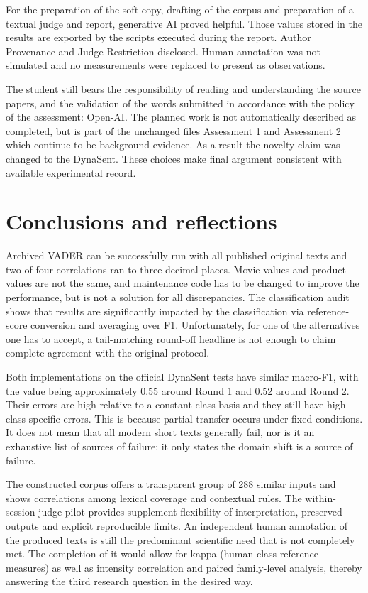 \documentclass[11pt]{article}
\begin{document}
For the preparation of the soft copy, drafting of the corpus and preparation of a textual judge and report, generative AI proved helpful. Those values stored in the results are exported by the scripts executed during the report. Author Provenance and Judge Restriction disclosed. Human annotation was not simulated and no measurements were replaced to present as observations.


The student still bears the responsibility of reading and understanding the source papers, and the validation of the words submitted in accordance with the policy of the assessment: Open-AI. The planned work is not automatically described as completed, but is part of the unchanged files Assessment 1 and Assessment 2 which continue to be background evidence. As a result the novelty claim was changed to the DynaSent. These choices make final argument consistent with available experimental record.


\section{Conclusions and reflections}

Archived VADER can be successfully run with all published original texts and two of four correlations ran to three decimal places. Movie values and product values are not the same, and maintenance code has to be changed to improve the performance, but is not a solution for all discrepancies. The classification audit shows that results are significantly impacted by the classification via reference-score conversion and averaging over F1. Unfortunately, for one of the alternatives one has to accept, a tail-matching round-off headline is not enough to claim complete agreement with the original protocol.


Both implementations on the official DynaSent tests have similar macro-F1, with the value being approximately 0.55 around Round 1 and 0.52 around Round 2. Their errors are high relative to a constant class basis and they still have high class specific errors. This is because partial transfer occurs under fixed conditions. It does not mean that all modern short texts generally fail, nor is it an exhaustive list of sources of failure; it only states the domain shift is a source of failure.


The constructed corpus offers a transparent group of 288 similar inputs and shows correlations among lexical coverage and contextual rules. The within-session judge pilot provides supplement flexibility of interpretation, preserved outputs and explicit reproducible limits. An independent human annotation of the produced texts is still the predominant scientific need that is not completely met. The completion of it would allow for kappa (human-class reference measures) as well as intensity correlation and paired family-level analysis, thereby answering the third research question in the desired way.
\end{document}
